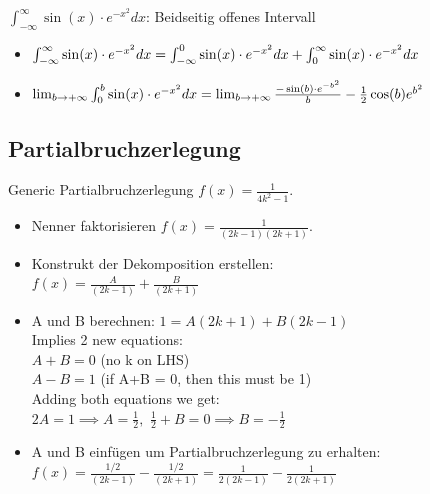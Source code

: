 \documentclass[a4paper]{article}
\begin{document}
\begin{bspbox}{$\int_{- \infty}^{\infty} \sin(x) \cdot e^{-x^2} dx$: Beidseitig offenes Intervall}
  \begin{itemize}[leftmargin=4.5mm, topsep=1pt, parsep=1pt]
    \item[1.] $\int_{- \infty}^{\infty} \sin(x) \cdot e^{-x^2} dx \\ = \int_{- \infty}^{0} \sin(x) \cdot e^{-x^2} dx + \int_{0}^{\infty} \sin(x) \cdot e^{-x^2} dx$
    \item[2.] $\lim_{b \rightarrow + \infty} \int_{0}^{b} \sin(x) \cdot e^{-x^2} dx \\ = \lim_{b \rightarrow + \infty} \frac{-\sin(b) \cdot e^{-b^2}}{b} - \frac{1}{2}\cos(b)e^{b^2}$
  \end{itemize}
\end{bspbox}


\subsection{Partialbruchzerlegung}
\begin{mainbox}{Generic Partialbruchzerlegung $f(x) = \frac{1}{4k^2 - 1}$.}
  \begin{itemize}[leftmargin=4.5mm, topsep=1pt, parsep=1pt]
    \item[1.] Nenner faktorisieren $f(x) = \frac{1}{(2k-1)(2k+1)}$.
    \item[2.] Konstrukt der Dekomposition erstellen: \\ $f(x) = \frac{A}{(2k-1)} + \frac{B}{(2k+1)}$
    \item[3.] A und B berechnen: $1 = A(2k+1)+B(2k-1)$ \\
      Implies 2 new equations: \\
        $A+B = 0$ (no k on LHS) \\
        $A-B = 1$ (if A+B = 0, then this must be 1) \\
        Adding both equations we get: \\
        $2A = 1 \implies A = \frac{1}{2},$ \qquad 
        $\frac{1}{2} + B = 0 \implies B = -\frac{1}{2}$ \\
    \item[4.] A und B einfügen um Partialbruchzerlegung zu erhalten: \\
      $f(x) = \frac{1/2}{(2k-1)} - \frac{1/2}{(2k+1)} = \frac{1}{2(2k-1)} - \frac{1}{2(2k+1)} $
  \end{itemize}
\end{mainbox}
\end{document}
